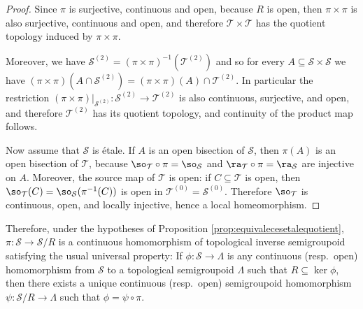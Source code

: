 \begin{proof}
    Since $\pi$ is surjective, continuous and open, because $R$ is open, then $\pi\times\pi$ is also surjective, continuous and open, and therefore $\mathcal{T}\times\mathcal{T}$ has the quotient topology induced by $\pi\times\pi$.
    
    Moreover, we have $\mathcal{S}^{(2)}=(\pi\times\pi)^{-1}\left(\mathcal{T}^{(2)}\right)$ and so for every $A\subseteq \mathcal{S}\times\mathcal{S}$ we have $(\pi\times\pi)(A\cap\mathcal{S}^{(2)})=(\pi\times\pi)(A)\cap\mathcal{T}^{(2)}$. In particular the restriction $(\pi\times\pi)|_{\mathcal{S}^{(2)}}\colon\mathcal{S}^{(2)}\to\mathcal{T}^{(2)}$ is also continuous, surjective, and open, and therefore $\mathcal{T}^{(2)}$ has its quotient topology, and continuity of the product map follows.
    
    Now assume that $\mathcal{S}$ is étale. If $A$ is an open bisection of $\mathcal{S}$, then $\pi(A)$ is an open bisection of $\mathcal{T}$, because $\so_{\mathcal{T}}\circ\pi=\so_{\mathcal{S}}$ and $\ra_{\mathcal{T}}\circ\pi=\ra_{\mathcal{S}}$ are injective on $A$. Moreover, the source map of $\mathcal{T}$ is open: if $C\subseteq\mathcal{T}$ is open, then $\so_{\mathcal{T}}(C)=\so_{\mathcal{S}}(\pi^{-1}(C))$ is open in $\mathcal{T}^{(0)}=\mathcal{S}^{(0)}$. Therefore $\so_{\mathcal{T}}$ is continuous, open, and locally injective, hence a local homeomorphism.\qedhere
\end{proof}

Therefore, under the hypotheses of Proposition \ref{prop:equivalecesetalequotient}, $\pi\colon\mathcal{S}\to\mathcal{S}/R$ is a continuous homomorphism of topological inverse semigroupoid satisfying the usual universal property: If $\phi\colon\mathcal{S}\to\Lambda$ is any continuous (resp.\ open) homomorphism from $\mathcal{S}$ to a topological semigroupoid $\Lambda$ such that $R\subseteq\ker\phi$, then there exists a unique continuous (resp.\ open) semigroupoid homomorphism $\psi\colon\mathcal{S}/R\to\Lambda$ such that $\phi=\psi\circ\pi$.

